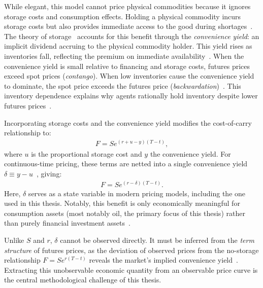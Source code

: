 \documentclass[sigconf, authorversion=true, nonacm=true]{acmart}
\begin{document}
While elegant, this model cannot price physical commodities because it ignores storage costs and consumption effects. Holding a physical commodity incurs storage costs but also provides immediate access to the good during shortages~\cite{Hull2022OptionsDerivatives}. The theory of storage~\cite{Kaldor1939Source:Studies, Working1949TheStorage, Brennan1958TheStorage} accounts for this benefit through the \textit{convenience yield}: an implicit dividend accruing to the physical commodity holder. This yield rises as inventories fall, reflecting the premium on immediate availability~\cite{Working1949TheStorage, Fama1987CommodityStorage, Caumon2004RedefiningMarket}. When the convenience yield is small relative to financing and storage costs, futures prices exceed spot prices (\textit{contango}). When low inventories cause the convenience yield to dominate, the spot price exceeds the futures price (\textit{backwardation})~\cite{Keynes1930AMoney, Caumon2004RedefiningMarket}. This inventory dependence explains why agents rationally hold inventory despite lower futures prices~\cite{Caumon2004RedefiningMarket}. 

Incorporating storage costs and the convenience yield modifies the cost-of-carry relationship to:
\begin{align} \label{eq:futures_overall}
F = Se^{(r+u-y)(T-t)},
\end{align}
where $u$ is the proportional storage cost and $y$ the convenience yield. For continuous-time pricing, these terms are netted into a single convenience yield $\delta \equiv y-u$~\cite{Brennan1985EvaluatingInvestments, Gibson1990StochasticClaims}, giving:
\begin{align} \label{eq:futures_convenience}
F = Se^{(r-\delta)(T-t)}.
\end{align}
Here, $\delta$ serves as a state variable in modern pricing models, including the one used in this thesis. Notably, this benefit is only economically meaningful for consumption assets (most notably oil, the primary focus of this thesis) rather than purely financial investment assets~\cite{Hull2022OptionsDerivatives}. 

Unlike $S$ and $r$, $\delta$ cannot be observed directly. It must be inferred from the \textit{term structure} of futures prices, as the deviation of observed prices from the no-storage relationship $F = Se^{r(T-t)}$ reveals the market's implied convenience yield~\cite{Liu2009No-ArbitrageStructures}. Extracting this unobservable economic quantity from an observable price curve is the central methodological challenge of this thesis.
\end{document}
